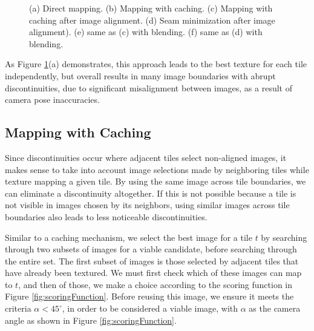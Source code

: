 \documentclass[10pt,twocolumn,letterpaper]{article}
\begin{document}
\begin{figure}[h!]
  \centering {}

  \centering {}
  \caption{(a) Direct mapping. (b) Mapping with caching. (c) Mapping
    with caching after image alignment. (d) Seam minimization after
    image alignment). (e) same as (c) with blending. (f) same as (d)
    with blending.}
  \label{fig:compareAll}
\end{figure}


As Figure \ref{fig:compareAll}(a) demonstrates, this approach leads to
the best texture for each tile independently, but overall results in
many image boundaries with abrupt discontinuities, due to significant
misalignment between images, as a result of camera pose inaccuracies.

\subsection{Mapping with Caching}
\label{sec:mappingWithCaching}
Since discontinuities occur where adjacent tiles select non-aligned
images, it makes sense to take into account image selections made by
neighboring tiles while texture mapping a given tile. By using the
same image across tile boundaries, we can eliminate a discontinuity
altogether. If this is not possible because a tile is not visible in
images chosen by its neighbors, using similar images across tile
boundaries also leads to less noticeable discontinuities.

Similar to a caching mechanism, we select the best image for a tile
$t$ by searching through two subsets of images for a viable candidate,
before searching through the entire set. The first subset of images is
those selected by adjacent tiles that have already been textured. We
must first check which of these images can map to $t$, and then of
those, we make a choice according to the scoring function in Figure
\ref{fig:scoringFunction}. Before reusing this image, we ensure it
meets the criteria $\alpha < 45^\circ$, in order to be considered a
viable image, with $\alpha$ as the camera angle as shown in Figure
\ref{fig:scoringFunction}.
\end{document}
